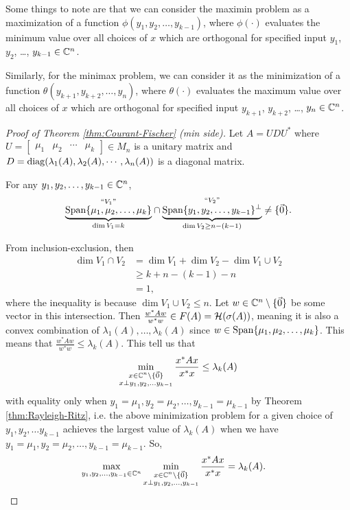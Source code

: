 Some things to note are that we can consider the maximin problem as a maximization of a function $\phi(y_1, y_2, \dots, y_{k-1})$, where $\phi(\cdot)$ evaluates the minimum value over all choices of $x$ which are orthogonal for specified input $y_1$, $y_2$, \dots, $y_{k-1} \in \mathbb C^n$.

Similarly, for the minimax problem, we can consider it as the minimization of a function $\theta(y_{k+1}, y_{k+2}, \dots, y_n)$, where $\theta(\cdot)$ evaluates the maximum value over all choices of $x$ which are orthogonal for specified input $y_{k+1}$, $y_{k+2}$, \dots, $y_n \in \mathbb C^n$.

\begin{proof}[Proof of Theorem \ref{thm:Courant-Fischer} (min side)]
Let $A = UDU^*$ where 
$U = 
    [\begin{array}{c|c|c|c}
    \mu_1 & \mu_2 & \cdots & \mu_k
    \end{array}]
\in M_n$
is a unitary matrix and $D = \operatorname{diag}(\lambda_1(A), \lambda_2(A), \cdots, \lambda_n(A))$ is a diagonal matrix.

For any $y_1, y_2, \dots, y_{k-1} \in \mathbb C^n$,
$$
\overset{``V_1"}{\underbrace{\operatorname{Span}\{\mu_1, \mu_2, \dots, \mu_k\}}_{\dim V_1 = k}} \cap 
\overset{``V_2"}{\underbrace{\operatorname{Span}\{y_1, y_2, \dots, y_{k-1}\}^\perp}_{\dim V_2 \geq n - (k-1)}}
\not= \{\Vec{0}\}.
$$

From inclusion-exclusion, then
\begin{align*}
    \dim V_1 \cap V_2 
        &= \dim V_1 + \dim V_2 - \dim V_1 \cup V_2 \\
        &\geq k + n - (k-1) - n \\
        &= 1,
\end{align*}
where the inequality is because $\dim V_1 \cup V_2 \leq n$. Let $w \in \mathbb C^n \setminus \{\Vec{0}\}$ be some vector in this intersection. Then $\frac{w^*Aw}{w^*w} \in F(A) = \mathcal{H}(\sigma(A))$, meaning it is also a convex combination of $\lambda_1(A), \dots, \lambda_k(A)$ since $w \in \operatorname{Span} \{\mu_1, \mu_2, \dots, \mu_k\}$. This means that $\frac{w^*Aw}{w^*w} \leq \lambda_k(A)$. This tell us that
$$
\min_{
    \substack{
        x \in \mathbb C^n \setminus \{\Vec{0}\} \\ 
        x \perp y_1, y_2, \dots y_{k-1}
    }
}
\frac{x^*Ax}{x^*x} \leq \lambda_k(A)
$$
with equality only when $y_1 = \mu_1, y_2 = \mu_2, \dots, y_{k-1} = \mu_{k-1}$ by Theorem \ref{thm:Rayleigh-Ritz}, i.e. the above minimization problem for a given choice of $y_1, y_2, \dots y_{k-1}$ achieves the largest value of $\lambda_k(A)$ when we have $y_1 = \mu_1, y_2 = \mu_2, \dots, y_{k-1} = \mu_{k-1}$. So,
\begin{align*}
    \max_{y_1, y_2, \dots, y_{k-1} \in \mathbb C^n}
    \min_{
        \substack{
            x \in \mathbb C^n \setminus \{\Vec{0}\} \\ 
            x \perp y_1, y_2, \dots, y_{k-1}}}
        \frac{x^*Ax}{x^*x} &= \lambda_k(A).
\end{align*}
\end{proof}

